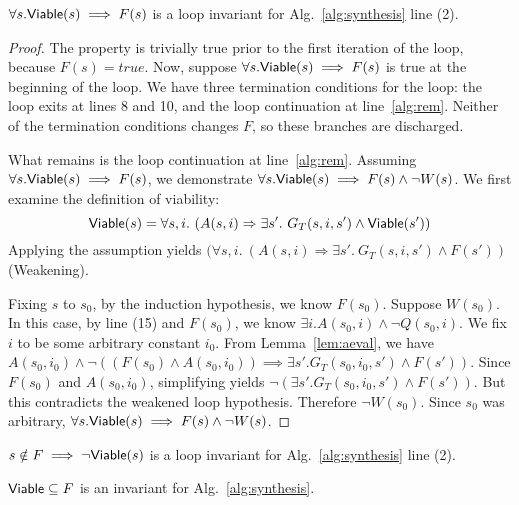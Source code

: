 \begin{lemma}
$\forall s. {\mathsf {Viable}}(s) \implies F(s)$ is a loop invariant for Alg.~\ref{alg:synthesis} line (2).
\label{lem:alg1-viable}
\end{lemma}

\begin{proof}
The property is trivially true prior to the first iteration of the loop, because
$F(s) = true$.  Now, suppose $\forall s . {\mathsf {Viable}}(s) \implies F(s)$ is true at the beginning of the loop.  We have three termination conditions for the loop: the loop exits at lines 8 and 10, and the loop continuation at line~\ref{alg:rem}.  Neither of the termination conditions changes $F$, so these branches are discharged.

What remains is the loop continuation at line~\ref{alg:rem}.  Assuming $\forall s . {\mathsf {Viable}}(s) \implies F(s)$, we demonstrate $\forall s . {\mathsf {Viable}}(s) \implies F(s) \land \lnot W(s)$.  We first examine the definition of viability:
\[
    {\mathsf {Viable}}(s) = \forall s,i. \ (A(s, i) \Rightarrow \exists s'.~ G_T(s, i,s') \land {\mathsf {Viable}}(s'))
\]
Applying the assumption yields $(\forall s,i. \ (A(s, i) \Rightarrow \exists s'.~ G_T(s, i,s') \land F(s'))$ (Weakening).

Fixing $s$ to $s_0$, by the induction hypothesis, we know $F(s_0)$.  Suppose $W(s_0)$.  In this case, by line (15) and $F(s_0)$, we know $\exists i. A(s_0, i) \land \lnot Q(s_0, i)$.  We fix $i$ to be some arbitrary constant $i_0$.  From Lemma~\ref{lem:aeval}, we have
$A(s_0, i_0) \land \lnot ((F(s_0) \land A(s_0,i_0)) \implies \exists s'.G_{T}(s_0,i_0,s') \land F(s'))$.  Since $F(s_0)$ and $A(s_0, i_0)$, simplifying
yields $\lnot (\exists s'.G_{T}(s_0,i_0,s') \land F(s'))$.  But this contradicts the weakened loop hypothesis.  Therefore $\lnot W(s_0)$.  Since $s_0$ was arbitrary, $\forall s . {\mathsf {Viable}}(s) \implies F(s) \land \lnot W(s)$.
\end{proof}

\begin{corollary}
$s \notin F \implies \lnot {\mathsf {Viable}}(s)$ is a loop invariant for Alg.~\ref{alg:synthesis} line (2).
\label{cor:alg1-nonviable}
\end{corollary}
\fi


\begin{lemma}
  ${\mathsf {Viable}} \subseteq F$ is an invariant for
  Alg.~\ref{alg:synthesis}.
\label{lem:alg1-viable}
\end{lemma}

